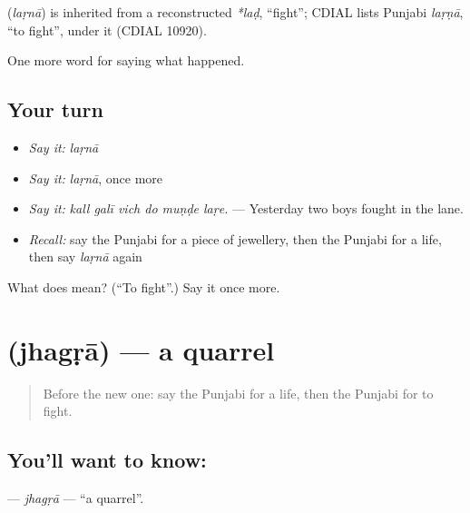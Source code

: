 \begin{cousinweb}
\textbf{} (\emph{laṛnā}) is inherited from a reconstructed \emph{*laḍ}, \textquotedblleft{}fight\textquotedblright{}; CDIAL lists Punjabi \emph{laṛṇā}, \textquotedblleft{}to fight\textquotedblright{}, under it (CDIAL 10920).
\end{cousinweb}

\begin{grammarlens}[title={What you've built}]
One more word for saying what happened.
\end{grammarlens}

\subsection*{Your turn}
\begin{itemize}
\raggedright
  \item \emph{Say it:} \emph{laṛnā}
  \item \emph{Say it:} \emph{laṛnā}, once more
  \item \emph{Say it:} \emph{kall galī vich do muṇḍe laṛe.} — Yesterday two boys fought in the lane.
  \item \emph{Recall:} say the Punjabi for a piece of jewellery, then the Punjabi for a life, then say \emph{laṛnā} again
\end{itemize}

\begin{tcolorbox}[breakable,colback=teal!4,colframe=teal!35!black,title={Before you move on}]
What does  mean? (\textquotedblleft{}To fight\textquotedblright{}.) Say it once more.
\end{tcolorbox}
\section[\texorpdfstring{\pa{ਝਗੜਾ} (jhagṛā)}{ਝਗੜਾ (jhagṛā)}]{ (jhagṛā) — a quarrel}

\label{lesson:PA-C316-jhagra}



\begin{quote}
Before the new one: say the Punjabi for a life, then the Punjabi for to fight.
\end{quote}

\subsection*{You'll want to know: }
\textbf{} — \emph{jhagṛā} — \textquotedblleft{}a quarrel\textquotedblright{}.

